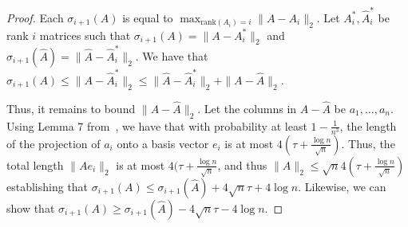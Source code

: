 \begin{proof}
Each $\sigma_{i+1}(A)$ is equal to $\max_{\text{rank}(A_{i}) = i} \|A - A_i\|_2$.
Let $A_i^*, \hat{A}_i^*$ be rank $i$ matrices such that $\sigma_{i+1}(A) = \|A - A_i^*\|_2$ and $\sigma_{i+1}(\hat{A}) = \|\hat{A} - \hat{A}_i^*\|_2$. We have that $\sigma_{i+1}(A) \leq \|A - \hat{A}_i^*\|_2 \leq \|\hat{A} - \hat{A}_i^*\|_2 + \|A - \hat{A}\|_2$. 

Thus, it remains to bound $\|A - \hat{A}\|_2$. Let the columns in $A - \hat{A}$ be $a_1, \ldots, a_n$. Using Lemma 7 from~\citet{vu2005spectral}, we have that with probability at least $1-\frac{1}{n^3}$, the length of the projection of $a_i$ onto a basis vector $e_i$ is at most $4(\tau + \frac{\log n}{\sqrt{n}})$. Thus, the total length $\|Ae_i\|_2$ is at most $4(\tau + \frac{\log n}{\sqrt{n}}$, and thus $\|A\|_2 \leq \sqrt{n}4(\tau + \frac{\log n}{\sqrt{n}})$ establishing that $\sigma_{i+1}(A) \leq \sigma_{i+1}(\hat{A}) + 4\sqrt{n}\tau + 4 \log n$. Likewise, we can show that $\sigma_{i+1}(A) \geq \sigma_{i+1}(\hat{A}) - 4\sqrt{n}\tau - 4 \log n$.
\end{proof}

